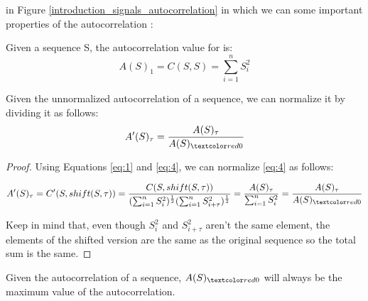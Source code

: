  in Figure
\ref{introduction_signals_autocorrelation} in which we can   
some important properties of the autocorrelation :

\begin{theorem}\label{theorem:1.2.1}
  Given a sequence S, the autocorrelation value for  is:
    \begin{equation}
      A(S)_{1}=C(S, S)=\sum_{i=1}^{n}S_{i}^2
    \end{equation}
\end{theorem}

\begin{corollary}
  Given the unnormalized autocorrelation of a sequence, we can
  normalize it by dividing it as follows:
  \begin{equation}
    A'(S)_{\tau} = \frac{A(S)_{\tau}}{A(S)_{\domingo{0}}}
  \end{equation}
\end{corollary}

\begin{proof}
  Using Equations \ref{eq:1} and \ref{eq:4}, we can normalize \ref{eq:4} as
  follows:

    $$A'(S)_{\tau} = C'(S, shift(S, \tau)) = \frac{C(S, shift(S, \tau))}{(\sum_{i=1}^{n} S_{i}^{2})^{\frac{1}{2}}(\sum_{i=1}^{n} S_{i+\tau}^{2})^\frac{1}{2}} = \frac{A(S)_{\tau}}{\sum_{i=1}^{n} S_{i}^{2}} = \frac{A(S)_{\tau}}{A(S)_{\domingo{0}}}$$

  Keep in mind that, even though $S_{i}^2$ and $S_{i+\tau}^2$ aren't the same element, the elements of the shifted version are the same as the original sequence so the total sum is the same.
\end{proof}

\begin{corollary}\label{autocorrelation:coro:1}
  Given the autocorrelation of a sequence, $A(S)_{\domingo{0}}$ will always be the maximum value of the autocorrelation.
\end{corollary}









